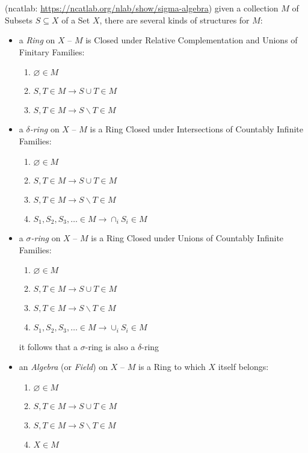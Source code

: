 (ncatlab: \url{https://ncatlab.org/nlab/show/sigma-algebra})
given a collection $M$ of Subsets $S \subseteq X$ of a Set $X$, there are
several kinds of structures for $M$:
\begin{itemize}
  \item a \emph{Ring} on $X$ -- $M$ is Closed under Relative Complementation and
    Unions of Finitary Families:
    \begin{enumerate}
      \item $\varnothing \in M$
      \item $S, T \in M \to S \cup T \in M$
      \item $S, T \in M \to S \backslash T \in M$
    \end{enumerate}
  \item a \emph{$\delta$-ring} on $X$ -- $M$ is a Ring Closed under
    Intersections of Countably Infinite Families:
    \begin{enumerate}
      \item $\varnothing \in M$
      \item $S, T \in M \to S \cup T \in M$
      \item $S, T \in M \to S \backslash T \in M$
      \item $S_1, S_2, S_3, \ldots \in M \to \cap_i S_i \in M$
    \end{enumerate}
  \item a \emph{$\sigma$-ring} on $X$ -- $M$ is a Ring Closed under Unions of
    Countably Infinite Families:
    \begin{enumerate}
      \item $\varnothing \in M$
      \item $S, T \in M \to S \cup T \in M$
      \item $S, T \in M \to S \backslash T \in M$
      \item $S_1, S_2, S_3, \ldots \in M \to \cup_i S_i \in M$
    \end{enumerate}
    it follows that a $\sigma$-ring is also a $\delta$-ring
  \item an \emph{Algebra} (or \emph{Field}) on $X$ -- $M$ is a Ring to which $X$
    itself belongs:
    \begin{enumerate}
      \item $\varnothing \in M$
      \item $S, T \in M \to S \cup T \in M$
      \item $S, T \in M \to S \backslash T \in M$
      \item $X \in M$
    \end{enumerate}

\end{itemize}
